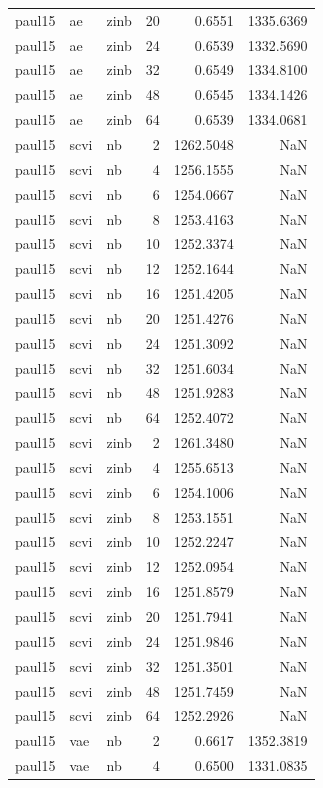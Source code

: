 \begin{tabular}{lllrrr}
paul15 & ae & zinb & 20 & 0.6551 & 1335.6369 \\
paul15 & ae & zinb & 24 & 0.6539 & 1332.5690 \\
paul15 & ae & zinb & 32 & 0.6549 & 1334.8100 \\
paul15 & ae & zinb & 48 & 0.6545 & 1334.1426 \\
paul15 & ae & zinb & 64 & 0.6539 & 1334.0681 \\
paul15 & scvi & nb & 2 & 1262.5048 & NaN \\
paul15 & scvi & nb & 4 & 1256.1555 & NaN \\
paul15 & scvi & nb & 6 & 1254.0667 & NaN \\
paul15 & scvi & nb & 8 & 1253.4163 & NaN \\
paul15 & scvi & nb & 10 & 1252.3374 & NaN \\
paul15 & scvi & nb & 12 & 1252.1644 & NaN \\
paul15 & scvi & nb & 16 & 1251.4205 & NaN \\
paul15 & scvi & nb & 20 & 1251.4276 & NaN \\
paul15 & scvi & nb & 24 & 1251.3092 & NaN \\
paul15 & scvi & nb & 32 & 1251.6034 & NaN \\
paul15 & scvi & nb & 48 & 1251.9283 & NaN \\
paul15 & scvi & nb & 64 & 1252.4072 & NaN \\
paul15 & scvi & zinb & 2 & 1261.3480 & NaN \\
paul15 & scvi & zinb & 4 & 1255.6513 & NaN \\
paul15 & scvi & zinb & 6 & 1254.1006 & NaN \\
paul15 & scvi & zinb & 8 & 1253.1551 & NaN \\
paul15 & scvi & zinb & 10 & 1252.2247 & NaN \\
paul15 & scvi & zinb & 12 & 1252.0954 & NaN \\
paul15 & scvi & zinb & 16 & 1251.8579 & NaN \\
paul15 & scvi & zinb & 20 & 1251.7941 & NaN \\
paul15 & scvi & zinb & 24 & 1251.9846 & NaN \\
paul15 & scvi & zinb & 32 & 1251.3501 & NaN \\
paul15 & scvi & zinb & 48 & 1251.7459 & NaN \\
paul15 & scvi & zinb & 64 & 1252.2926 & NaN \\
paul15 & vae & nb & 2 & 0.6617 & 1352.3819 \\
paul15 & vae & nb & 4 & 0.6500 & 1331.0835 \\

\end{tabular}
